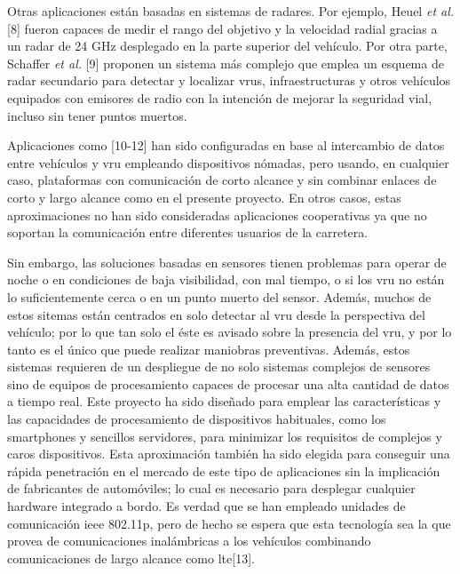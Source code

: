 Otras aplicaciones están basadas en sistemas de radares. Por ejemplo, Heuel \emph{et al.} [8] fueron capaces de medir el rango del objetivo y la velocidad radial gracias a un radar de 24 GHz desplegado en la parte superior del vehículo. Por otra parte, Schaffer \emph{et al.} [9] proponen un sistema más complejo que emplea un esquema de radar secundario para detectar y localizar \gls{vru}s, infraestructuras y otros vehículos equipados con emisores de radio con la intención de mejorar la seguridad vial, incluso sin tener puntos muertos.

Aplicaciones como [10-12] han sido configuradas en base al intercambio de datos entre vehículos y \gls{vru} empleando dispositivos nómadas, pero usando, en cualquier caso, plataformas con comunicación de corto alcance y sin combinar enlaces de corto y largo alcance como en el presente proyecto. En otros casos, estas aproximaciones no han sido consideradas aplicaciones cooperativas ya que no soportan la comunicación entre diferentes usuarios de la carretera.

Sin embargo, las soluciones basadas en sensores tienen problemas para operar de noche o en condiciones de baja visibilidad, con mal tiempo, o si los \gls{vru} no están lo suficientemente cerca o en un punto muerto del sensor. Además, muchos de estos sitemas están centrados en solo detectar al \gls{vru} desde la perspectiva del vehículo; por lo que tan solo el éste es avisado sobre la presencia del
\gls{vru}, y por lo tanto es el único que puede realizar maniobras preventivas. Además, estos sistemas requieren de un despliegue de no solo sistemas complejos de sensores sino de equipos de procesamiento capaces de procesar una alta cantidad de datos a tiempo real. Este proyecto ha sido diseñado para emplear las características y las capacidades de procesamiento de dispositivos habituales, como los smartphones y sencillos servidores, para minimizar los requisitos de complejos y caros dispositivos. Esta aproximación también ha sido elegida para conseguir una rápida penetración en el mercado de este tipo de aplicaciones sin la implicación de fabricantes de automóviles; lo cual es necesario para desplegar cualquier hardware integrado a bordo. Es verdad que se han empleado unidades de comunicación \gls{ieee} 802.11p, pero de hecho se espera que esta tecnología sea la que provea de comunicaciones inalámbricas a los vehículos combinando comunicaciones de largo alcance como \gls{lte}[13].

